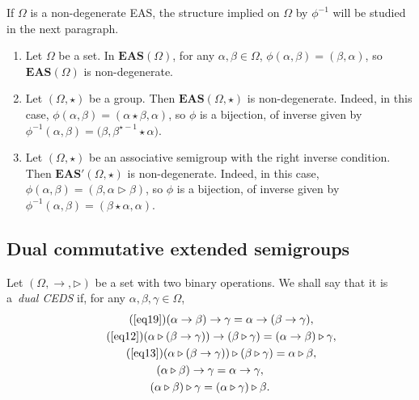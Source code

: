 \documentclass[pdftex]{sigma}
\numberwithin{equation}{section}
\newcommand{\eas}{\mathbf{EAS}}
\begin{document}
If $\Omega$ is a non-degenerate EAS, the structure implied on $\Omega$ by $\phi^{-1}$ will be studied in the next paragraph.

\begin{Example}\qquad
\begin{enumerate}\itemsep=0pt
\item[(1)] Let $\Omega$ be a set. In $\eas(\Omega)$, for any $\alpha,\beta \in \Omega$, $\phi(\alpha,\beta)=(\beta,\alpha)$, so $\eas(\Omega)$ is non-degenerate.
\item[(2)] Let $(\Omega,\star)$ be a group. Then $\eas(\Omega,\star)$ is non-degenerate. Indeed, in this case, $\phi(\alpha,\beta)=(\alpha\star\beta,\alpha)$, so $\phi$ is a bijection, of inverse given by $\phi^{-1}(\alpha,\beta)=\bigl(\beta,\beta^{\star-1}\star \alpha\bigr)$.
\item[(3)] Let $(\Omega,\star)$ be an associative semigroup with the right inverse condition. Then $\eas'(\Omega,\star)$ is non-degenerate.
Indeed, in this case, $\phi(\alpha,\beta)=(\beta,\alpha\triangleright \beta)$, so $\phi$ is a bijection, of inverse given by $\phi^{-1}(\alpha,\beta)=(\beta\star \alpha,\alpha)$.
\end{enumerate}\end{Example}


\subsection{Dual commutative extended semigroups}

\begin{Definition}
Let $(\Omega,\rightarrow,\triangleright)$ be a set with two binary operations. We shall say that it is a~\emph{dual CEDS} if, for any $\alpha,\beta,\gamma \in \Omega$,
\begin{gather}%
\tag{\ref{eq19}} (\alpha \rightarrow \beta)\rightarrow \gamma=\alpha \rightarrow (\beta \rightarrow \gamma),\\
\tag{\ref{eq12}}(\alpha \triangleright (\beta \rightarrow \gamma))\rightarrow (\beta \triangleright \gamma)=(\alpha \rightarrow \beta) \triangleright \gamma,\\
\tag{\ref{eq13}} (\alpha \triangleright (\beta \rightarrow \gamma))\triangleright (\beta \triangleright \gamma)=\alpha \triangleright \beta,\\
 (\alpha \triangleright \beta) \rightarrow \gamma=\alpha \rightarrow \gamma,\\
 (\alpha \triangleright \beta) \triangleright \gamma=(\alpha \triangleright \gamma)\triangleright \beta.
\end{gather}\end{Definition}
\end{document}
